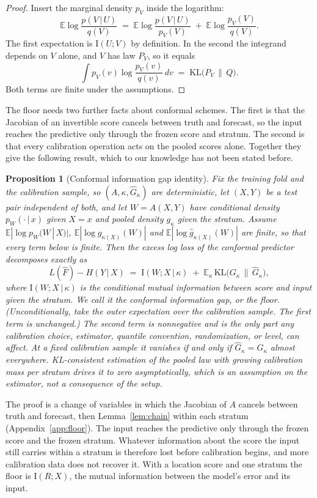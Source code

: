 \documentclass[11pt]{article}
\newtheorem{proposition}{Proposition}
\theoremstyle{remark}
\newcommand{\E}{\mathbb{E}}
\newcommand{\I}{\mathrm{I}}
\newcommand{\given}{\,|\,}
\newcommand{\KLop}{\mathrm{KL}}
\begin{document}
\begin{proof}
Insert the marginal density $p_V$ inside the logarithm:
\[
\E\log\frac{p(V\given U)}{q(V)}
\;=\;\E\log\frac{p(V\given U)}{p_V(V)}\;+\;\E\log\frac{p_V(V)}{q(V)} .
\]
The first expectation is $\I(U;V)$ by definition. In the second the integrand
depends on $V$ alone, and $V$ has law $P_V$, so it equals
\[
\int p_V(v)\log\frac{p_V(v)}{q(v)}\,dv \;=\;\KLop\!\big(P_V\,\|\,Q\big).
\]
Both terms are finite under the assumptions.
\end{proof}

The floor needs two further facts about conformal schemes. The first is that the
Jacobian of an invertible score cancels between truth and forecast, so the input
reaches the predictive only through the frozen score and stratum. The second is that
every calibration operation acts on the pooled scores alone. Together they give the
following result, which to our knowledge has not been stated before.

\begin{proposition}[Conformal information gap identity]\label{prop:floor}
Fix the training fold and the calibration sample, so $(A,\kappa,\widehat
G_\kappa)$ are deterministic, let $(X,Y)$ be a test pair independent of both,
and let $W=A(X,Y)$ have conditional density $p_W(\cdot\given x)$ given $X=x$ and
pooled density $g_\kappa$ given the stratum. Assume $\E|\log p_W(W\given X)|$,
$\E|\log g_{\kappa(X)}(W)|$ and $\E|\log\widehat g_{\kappa(X)}(W)|$ are finite, so that
every term below is finite. Then the excess log loss of the conformal predictor
decomposes exactly as
\[
L(\widehat F) - H(Y\given X)
\;=\; \I(W;X\given\kappa)
\;+\; \E_{\kappa}\,\KLop\!\big(G_{\kappa}\,\|\,\widehat G_{\kappa}\big),
\]
where $\I(W;X\given\kappa)$ is the conditional mutual information between score
and input given the stratum. We call it the conformal information gap, or the floor. (Unconditionally, take the outer expectation over
the calibration sample. The first term is unchanged.) The second term is
nonnegative and is the only part any calibration choice, estimator, quantile
convention, randomization, or level, can affect. At a fixed calibration sample
it vanishes if and only if $\widehat G_\kappa=G_\kappa$ almost everywhere.
KL-consistent estimation of the pooled law with growing calibration mass per
stratum drives it to zero asymptotically, which is an assumption on the
estimator, not a consequence of the setup.
\end{proposition}

The proof is a change of variables in which the Jacobian of $A$ cancels between
truth and forecast, then Lemma~\ref{lem:chain} within each stratum
(Appendix~\ref{app:floor}). The input reaches the predictive only through the
frozen score and the frozen stratum. Whatever information about the score the
input still carries within a stratum is therefore lost before calibration begins,
and more calibration data does not recover it. With
a location score and one stratum the floor is $\I(R;X)$, the mutual information
between the model's error and its input.
\end{document}
